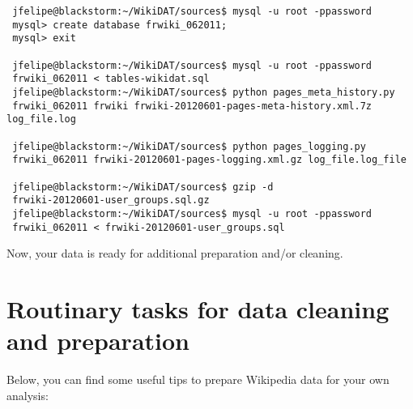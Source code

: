 \begin{verbatim}
 jfelipe@blackstorm:~/WikiDAT/sources$ mysql -u root -ppassword
 mysql> create database frwiki_062011;
 mysql> exit

 jfelipe@blackstorm:~/WikiDAT/sources$ mysql -u root -ppassword 
 frwiki_062011 < tables-wikidat.sql
 jfelipe@blackstorm:~/WikiDAT/sources$ python pages_meta_history.py 
 frwiki_062011 frwiki frwiki-20120601-pages-meta-history.xml.7z log_file.log

 jfelipe@blackstorm:~/WikiDAT/sources$ python pages_logging.py 
 frwiki_062011 frwiki-20120601-pages-logging.xml.gz log_file.log_file

 jfelipe@blackstorm:~/WikiDAT/sources$ gzip -d 
 frwiki-20120601-user_groups.sql.gz
 jfelipe@blackstorm:~/WikiDAT/sources$ mysql -u root -ppassword 
 frwiki_062011 < frwiki-20120601-user_groups.sql
\end{verbatim}

Now, your data is ready for additional preparation and/or cleaning.

\section{Routinary tasks for data cleaning and preparation}
\label{sec:routinary-tasks}
Below, you can find some useful tips to prepare Wikipedia data for your own
analysis:


